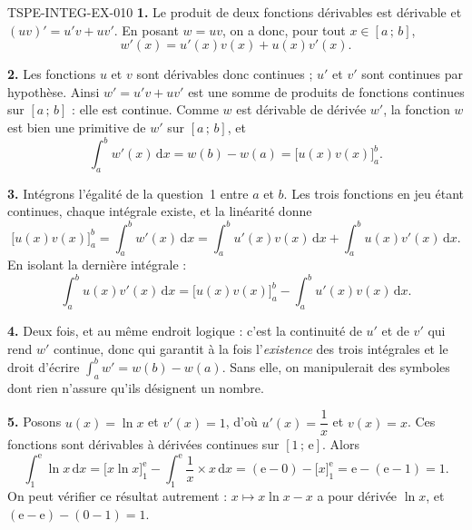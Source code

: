 \begin{corrige}{TSPE-INTEG-EX-010}
\textbf{1.} Le produit de deux fonctions dérivables est dérivable et
$(uv)'=u'v+uv'$. En posant $w=uv$, on a donc, pour tout $x\in[a\,;\,b]$,
\[
  w'(x)=u'(x)v(x)+u(x)v'(x).
\]

\textbf{2.} Les fonctions $u$ et $v$ sont dérivables donc continues ; $u'$ et
$v'$ sont continues par hypothèse. Ainsi $w'=u'v+uv'$ est une somme de produits
de fonctions continues sur $[a\,;\,b]$ : elle est continue. Comme $w$ est
dérivable de dérivée $w'$, la fonction $w$ est bien une primitive de $w'$ sur
$[a\,;\,b]$, et
\[
  \int_a^b w'(x)\,\mathrm{d}x=w(b)-w(a)=\Big[u(x)v(x)\Big]_a^b.
\]

\textbf{3.} Intégrons l'égalité de la question~1 entre $a$ et $b$. Les trois
fonctions en jeu étant continues, chaque intégrale existe, et la linéarité donne
\[
  \Big[u(x)v(x)\Big]_a^b=\int_a^b w'(x)\,\mathrm{d}x
  =\int_a^b u'(x)v(x)\,\mathrm{d}x+\int_a^b u(x)v'(x)\,\mathrm{d}x.
\]
En isolant la dernière intégrale :
\[
  \int_a^b u(x)v'(x)\,\mathrm{d}x
  =\Big[u(x)v(x)\Big]_a^b-\int_a^b u'(x)v(x)\,\mathrm{d}x.
\]

\textbf{4.} Deux fois, et au même endroit logique : c'est la continuité de $u'$
et de $v'$ qui rend $w'$ continue, donc qui garantit à la fois l'\emph{existence}
des trois intégrales et le droit d'écrire $\int_a^b w'=w(b)-w(a)$. Sans elle, on
manipulerait des symboles dont rien n'assure qu'ils désignent un nombre.

\textbf{5.} Posons $u(x)=\ln x$ et $v'(x)=1$, d'où $u'(x)=\dfrac1x$ et
$v(x)=x$. Ces fonctions sont dérivables à dérivées continues sur
$[1\,;\,\mathrm{e}]$. Alors
\[
  \int_1^{\mathrm{e}}\ln x\,\mathrm{d}x
  =\Big[x\ln x\Big]_1^{\mathrm{e}}-\int_1^{\mathrm{e}}\dfrac1x\times x\,\mathrm{d}x
  =\left(\mathrm{e}-0\right)-\Big[x\Big]_1^{\mathrm{e}}
  =\mathrm{e}-(\mathrm{e}-1)=1.
\]
On peut vérifier ce résultat autrement : $x\mapsto x\ln x-x$ a pour dérivée
$\ln x$, et $(\mathrm{e}-\mathrm{e})-(0-1)=1$.
\end{corrige}
